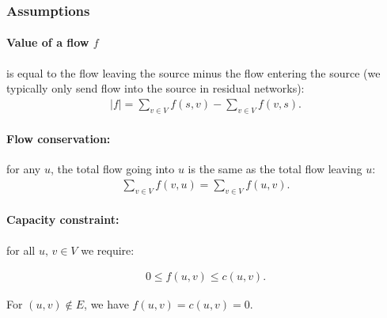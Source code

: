 \subsubsection{Assumptions}

\paragraph{Value of a flow $f$} is equal to the flow leaving the source minus the flow
entering the source (we typically only send flow into the source in residual
networks):
\begin{align}
  |f| = \sum_{v \in V} f(s, v) - \sum_{v \in V} f(v, s).
\end{align}

\paragraph{Flow conservation:} for any $u$, the total flow going into $u$ is the same as the
total flow leaving $u$:
\begin{align}
  \sum_{v \in V} f(v, u) = \sum_{v \in V} f(u, v).
\end{align}

\paragraph{Capacity constraint:} for all $u,\, v \in V$ we require:

\begin{align}
  0 \leq f(u, v) \leq c(u, v).
\end{align}

For $(u, v) \not \in E$, we have $f(u, v) = c(u, v) = 0$.
